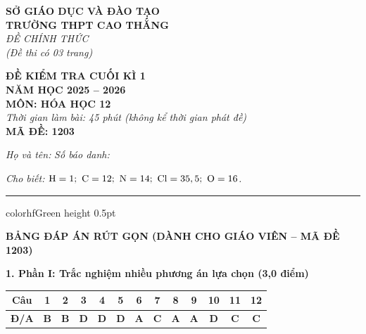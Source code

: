 \documentclass[11pt,a4paper]{article}
\begin{document}
\begin{minipage}[t]{0.48\textwidth}
\textbf{SỞ GIÁO DỤC VÀ ĐÀO TẠO}\\
\textbf{TRƯỜNG THPT CAO THẮNG}\\
\textit{ĐỀ CHÍNH THỨC}\\
\textit{(Đề thi có 03 trang)}
\end{minipage}
\hfill
\begin{minipage}[t]{0.48\textwidth}
\raggedleft
\textbf{\color{hfRed}ĐỀ KIỂM TRA CUỐI KÌ 1}\\
\textbf{NĂM HỌC 2025 -- 2026}\\
\textbf{MÔN: HÓA HỌC 12}\\
\textit{Thời gian làm bài: 45 phút (không kể thời gian phát đề)}\\
\textbf{MÃ ĐỀ: 1203}
\end{minipage}

\vspace{4pt}
\noindent
\textit{Họ và tên:} \dotfill \textit{Số báo danh:} \dotfill

\vspace{3pt}
\noindent
\textit{\footnotesize Cho biết: $\ce{H}=1;\ \ce{C}=12;\ \ce{N}=14;\ \ce{Cl}=35,5;\ \ce{O}=16$.}

\vspace{3pt}
\hrule color{hfGreen} height 0.5pt

\vspace{6pt}
\begin{center}
{\Large\textbf{\color{hfRed}BẢNG ĐÁP ÁN RÚT GỌN (DÀNH CHO GIÁO VIÊN -- MÃ ĐỀ 1203)}}
\end{center}

\vspace{2pt}
\noindent
\textbf{\color{mainGreen}1. Phần I: Trắc nghiệm nhiều phương án lựa chọn (3,0 điểm)}
\begin{center}
\renewcommand{\arraystretch}{1.2}
\begin{tabular}{|c|c|c|c|c|c|c|c|c|c|c|c|c|}
\hline
\rowcolor{tableGreen}
\textbf{Câu} & \textbf{1} & \textbf{2} & \textbf{3} & \textbf{4} & \textbf{5} & \textbf{6} & \textbf{7} & \textbf{8} & \textbf{9} & \textbf{10} & \textbf{11} & \textbf{12} \\
\hline
\textbf{Đ/A} & \textbf{\color{hfRed}B} & \textbf{\color{hfRed}B} & \textbf{\color{hfRed}D} & \textbf{\color{hfRed}D} & \textbf{\color{hfRed}D} & \textbf{\color{hfRed}A} & \textbf{\color{hfRed}C} & \textbf{\color{hfRed}A} & \textbf{\color{hfRed}A} & \textbf{\color{hfRed}D} & \textbf{\color{hfRed}C} & \textbf{\color{hfRed}C} \\
\hline
\end{tabular}
\end{center}
\end{document}
